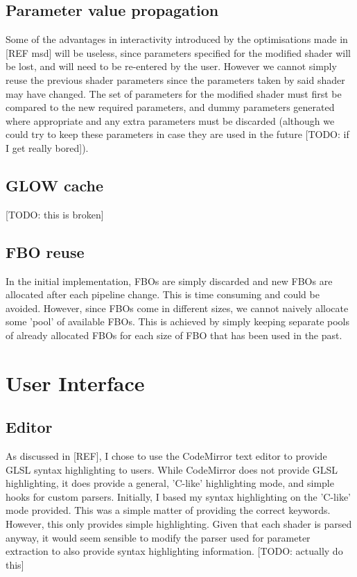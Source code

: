 \documentclass[12pt,twoside,notitlepage]{report}
\begin{document}
\subsection{Parameter value propagation}
Some of the advantages in interactivity introduced by the optimisations made in [REF msd] will be useless, since parameters specified for the modified shader will be lost, and will need to be re-entered by the user. However we cannot simply reuse the previous shader parameters since the parameters taken by said shader may have changed. The set of parameters for the modified shader must first be compared to the new required parameters, and dummy parameters generated where appropriate and any extra parameters must be discarded (although we could try to keep these parameters in case they are used in the future [TODO: if I get really bored]). 

\subsection{GLOW cache}
[TODO: this is broken]

\subsection{FBO reuse}
In the initial implementation, FBOs are simply discarded and new FBOs are allocated after each pipeline change. This is time consuming and could be avoided. However, since FBOs come in different sizes, we cannot naively allocate some 'pool' of available FBOs. This is achieved by simply keeping separate pools of already allocated FBOs for each size of FBO that has been used in the past.

\section{User Interface}
\subsection{Editor}
As discussed in [REF], I chose to use the CodeMirror text editor to provide GLSL syntax highlighting to users. While CodeMirror does not provide GLSL highlighting, it does provide a general, 'C-like' highlighting mode, and simple hooks for custom parsers. Initially, I based my syntax highlighting on the 'C-like' mode provided. This was a simple matter of providing the correct keywords. However, this only provides simple highlighting. Given that each shader is parsed anyway, it would seem sensible to modify the parser used for parameter extraction to also provide syntax highlighting information. [TODO: actually do this]
\end{document}
